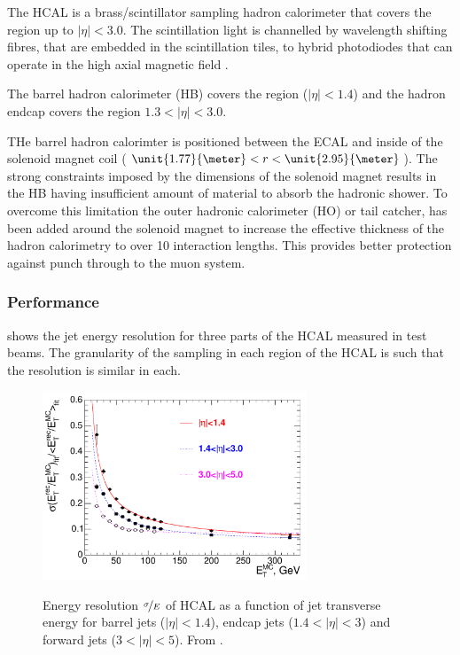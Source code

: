 The {HCAL} is a brass/scintillator
sampling hadron calorimeter that covers the region up to $|\eta|<3.0$.  The
scintillation light is channelled by wavelength shifting fibres, that are
embedded in the scintillation tiles, to hybrid photodiodes that can operate in
the high axial magnetic field \cite{chatrchyan2008cms}.

The barrel hadron calorimeter (HB) covers the region ($|\eta| < 1.4$)
and the hadron endcap covers the region $1.3 < |\eta| < 3.0$.

THe barrel hadron calorimter is
positioned between the ECAL and inside of the solenoid magnet coil
($\unit{1.77}{\meter}<r<\unit{2.95}{\meter}$).
The strong constraints imposed by the dimensions of the solenoid magnet results
in the HB having insufficient amount of material to absorb the hadronic shower. 
To overcome this limitation the outer hadronic calorimeter (HO) or tail catcher,
has been added around the solenoid magnet to increase the
effective thickness of the hadron calorimetry to over 10 interaction lengths.
This provides better protection against punch through to the muon system.

\subsubsection{Performance}

 shows the jet energy resolution for three parts of
the {HCAL} measured in test beams. The granularity of the sampling in each
region of the HCAL is such that the resolution is similar in each.
\begin{figure}[htbp]
  \centering
  \includegraphics[width=0.7\textwidth]{hcal_performance}
  \label{fig:hcalperform}
  \caption{Energy resolution $\nicefrac{\sigma}{E}$ of HCAL as a function of jet
transverse energy for barrel jets ($|\eta| < 1.4$), endcap jets ($1.4<|\eta| <
3$) and forward jets ($3<|\eta| < 5$). From \cite{chatrchyan2008cms}. }
\end{figure}


